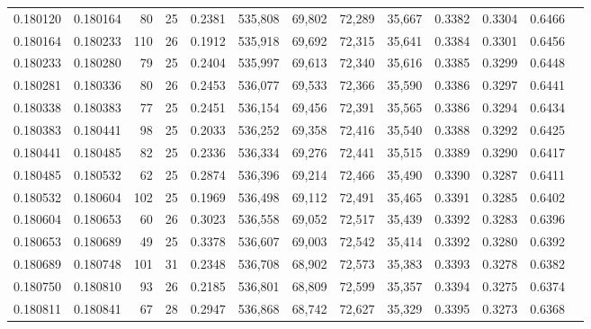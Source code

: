 \begin{tabular}{rrrrrrrrrrrrr}
0.180120 & 0.180164 &    80 &  25 &                                     0.2381 & 535,808 &  69,802 &  72,289 &  35,667 & 0.3382 & 0.3304 & 0.6466 \\
0.180164 & 0.180233 &   110 &  26 &                                     0.1912 & 535,918 &  69,692 &  72,315 &  35,641 & 0.3384 & 0.3301 & 0.6456 \\
0.180233 & 0.180280 &    79 &  25 &                                     0.2404 & 535,997 &  69,613 &  72,340 &  35,616 & 0.3385 & 0.3299 & 0.6448 \\
0.180281 & 0.180336 &    80 &  26 &                                     0.2453 & 536,077 &  69,533 &  72,366 &  35,590 & 0.3386 & 0.3297 & 0.6441 \\
0.180338 & 0.180383 &    77 &  25 &                                     0.2451 & 536,154 &  69,456 &  72,391 &  35,565 & 0.3386 & 0.3294 & 0.6434 \\
0.180383 & 0.180441 &    98 &  25 &                                     0.2033 & 536,252 &  69,358 &  72,416 &  35,540 & 0.3388 & 0.3292 & 0.6425 \\
0.180441 & 0.180485 &    82 &  25 &                                     0.2336 & 536,334 &  69,276 &  72,441 &  35,515 & 0.3389 & 0.3290 & 0.6417 \\
0.180485 & 0.180532 &    62 &  25 &                                     0.2874 & 536,396 &  69,214 &  72,466 &  35,490 & 0.3390 & 0.3287 & 0.6411 \\
0.180532 & 0.180604 &   102 &  25 &                                     0.1969 & 536,498 &  69,112 &  72,491 &  35,465 & 0.3391 & 0.3285 & 0.6402 \\
0.180604 & 0.180653 &    60 &  26 &                                     0.3023 & 536,558 &  69,052 &  72,517 &  35,439 & 0.3392 & 0.3283 & 0.6396 \\
0.180653 & 0.180689 &    49 &  25 &                                     0.3378 & 536,607 &  69,003 &  72,542 &  35,414 & 0.3392 & 0.3280 & 0.6392 \\
0.180689 & 0.180748 &   101 &  31 &                                     0.2348 & 536,708 &  68,902 &  72,573 &  35,383 & 0.3393 & 0.3278 & 0.6382 \\
0.180750 & 0.180810 &    93 &  26 &                                     0.2185 & 536,801 &  68,809 &  72,599 &  35,357 & 0.3394 & 0.3275 & 0.6374 \\
0.180811 & 0.180841 &    67 &  28 &                                     0.2947 & 536,868 &  68,742 &  72,627 &  35,329 & 0.3395 & 0.3273 & 0.6368 \\

\end{tabular}
